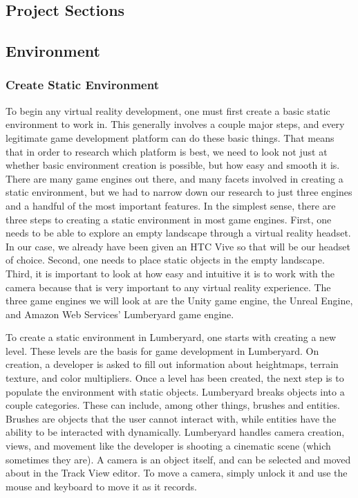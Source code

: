 \documentclass[10pt,journal,compsoc,onecolumn, draftclsnofoot]{IEEEtran}
\begin{document}
\begin{bibunit}
\section{Project Sections}
\subsection{Environment}
\subsubsection{Create Static Environment}
To begin any virtual reality development, one must first create a basic static environment to work in.
This generally involves a couple major steps, and every legitimate game development platform can do these basic things.
That means that in order to research which platform is best, we need to look not just at whether basic environment creation is possible, but how easy and smooth it is.
There are many game engines out there, and many facets involved in creating a static environment, but we had to narrow down our research to just three engines and a handful of the most important features.
In the simplest sense, there are three steps to creating a static environment in most game engines.
First, one needs to be able to explore an empty landscape through a virtual reality headset.
In our case, we already have been given an HTC Vive so that will be our headset of choice.
Second, one needs to place static objects in the empty landscape.
Third, it is important to look at how easy and intuitive it is to work with the camera because that is very important to any virtual reality experience.
The three game engines we will look at are the Unity game engine, the Unreal Engine, and Amazon Web Services' Lumberyard game engine.

To create a static environment in Lumberyard, one starts with creating a new level.  These levels are the basis for game development in Lumberyard. \cite{lumberyard_levels_environment}
On creation, a developer is asked to fill out information about heightmaps, terrain texture, and color multipliers.
Once a level has been created, the next step is to populate the environment with static objects.
Lumberyard breaks objects into a couple categories.  These can include, among other things, brushes and entities.
Brushes are objects that the user cannot interact with, while entities have the ability to be interacted with dynamically. \cite{lumberyard_object_system}
Lumberyard handles camera creation, views, and movement like the developer is shooting a cinematic scene (which sometimes they are).
A camera is an object itself, and can be selected and moved about in the Track View editor.
To move a camera, simply unlock it and use the mouse and keyboard to move it as it records. \cite{lumberyard_object_system}


\end{bibunit}
\end{document}
